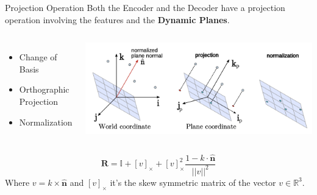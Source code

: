 \documentclass{beamer}
\begin{document}
\begin{frame}{Projection Operation}
  Both the Encoder and the Decoder have a projection operation involving the features and the \textbf{Dynamic Planes}.
  \begin{columns}[T]
      \vspace{1.5em}
      \begin{itemize}
        \item Change of Basis
        \item Orthographic Projection
        \item Normalization
      \end{itemize}
      \includegraphics[width=\textwidth]{../media/projection.png}
  \end{columns}
  \vspace{1em}
  \begin{equation}
    \mathbf{R} = \mathbb{I} + [v]_{\times} + [v]_{\times}^2 \frac{1 - k \cdot \hat{\textbf{n}}}{|| v ||^2}
  \end{equation}
  Where $v = k \times \hat{\textbf{n}} $ and $[v]_{\times}$ it's the skew symmetric matrix of the vector $v \in \mathbb{R}^3$.
\end{frame}
\end{document}
